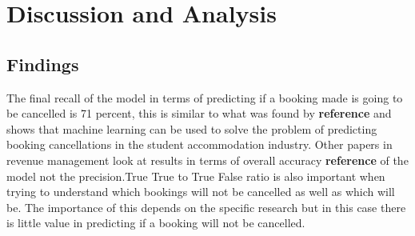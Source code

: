 \chapter{Discussion and Analysis}

\section{Findings}
The final recall of the model in terms of predicting if a booking made is going to be cancelled is 71 percent, this is similar to what was found by \textbf{reference} and shows that machine learning can be used to solve the problem of predicting booking cancellations in the student accommodation industry. Other papers in revenue management look at results in terms of overall accuracy \textbf{reference} of the model not the precision.True True to True False ratio is also important when trying to understand which bookings will not be cancelled as well as which will be. The importance of this depends on the specific research but in this case there is little value in predicting if a booking will not be cancelled.
\vspace{5mm}


